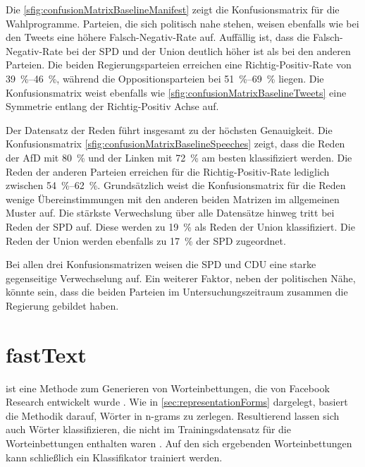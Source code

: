 Die \autoref{sfig:confusionMatrixBaselineManifest} zeigt die Konfusionsmatrix für die Wahlprogramme. Parteien, die sich politisch nahe stehen, weisen ebenfalls wie bei den Tweets eine höhere Falsch-Negativ-Rate auf. Auffällig ist, dass die Falsch-Negativ-Rate bei der \ac{SPD} und der Union deutlich höher ist als bei den anderen Parteien. Die beiden Regierungsparteien erreichen eine Richtig-Positiv-Rate von \SIrange{39}{46}{\percent}, während die Oppositionsparteien bei \SIrange{51}{69}{\percent} liegen. Die Konfusionsmatrix weist ebenfalls wie \autoref{sfig:confusionMatrixBaselineTweets} eine Symmetrie entlang der Richtig-Positiv Achse auf.

Der Datensatz der Reden führt insgesamt zu der höchsten Genauigkeit. Die Konfusionsmatrix \autoref{sfig:confusionMatrixBaselineSpeeches} zeigt, dass die Reden der \ac{AfD} mit \SI{80}{\percent} und der Linken mit \SI{72}{\percent} am besten klassifiziert werden. Die Reden der anderen Parteien erreichen für die Richtig-Positiv-Rate lediglich zwischen \SIrange{54}{62}{\percent}. Grundsätzlich weist die Konfusionsmatrix für die Reden wenige Übereinstimmungen mit den anderen beiden Matrizen im allgemeinen Muster auf. Die stärkste Verwechslung über alle Datensätze hinweg tritt bei Reden der \ac{SPD} auf. Diese werden zu \SI{19}{\percent} als Reden der Union klassifiziert. Die Reden der Union werden ebenfalls zu \SI{17}{\percent} der \ac{SPD} zugeordnet.

Bei allen drei Konfusionsmatrizen weisen die \ac{SPD} und \ac{CDU} eine starke gegenseitige Verwechselung auf. Ein weiterer Faktor, neben der politischen Nähe, könnte sein, dass die beiden Parteien im Untersuchungszeitraum zusammen die Regierung gebildet haben.

\section{fastText} \label{sec:trainingFastText}

\ft ist eine Methode zum Generieren von Worteinbettungen, die von Facebook Research entwickelt wurde \autocite{joulin_bag_2016}. Wie in \autoref{sec:representationForms} dargelegt, basiert die Methodik darauf, Wörter in n-grams zu zerlegen. Resultierend lassen sich auch Wörter klassifizieren, die nicht im Trainingsdatensatz für die Worteinbettungen enthalten waren \autocite{guhr_training_2020}. Auf den sich ergebenden Worteinbettungen kann schließlich ein Klassifikator trainiert werden.


